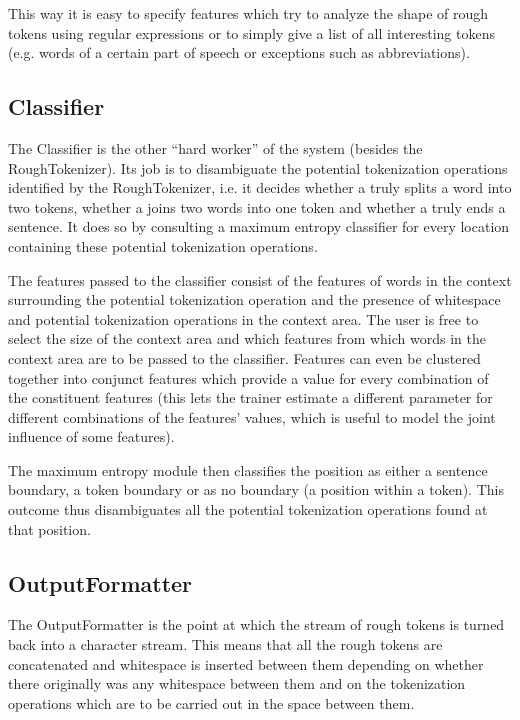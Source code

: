This way it is easy to specify features which try to analyze the shape
of rough tokens using regular expressions or to simply give a list of
all interesting tokens (e.g. words of a certain part of speech or
exceptions such as abbreviations).

\subsection{Classifier}

The Classifier is the other ``hard worker'' of the system (besides the
RoughTokenizer). Its job is to disambiguate the potential tokenization
operations identified by the RoughTokenizer, i.e. it decides whether a
\maysplit{} truly splits a word into two tokens, whether a \mayjoin{}
joins two words into one token and whether a \maybreaksentence{} truly
ends a sentence. It does so by consulting a maximum entropy classifier
for every location containing these potential tokenization operations.

The features passed to the classifier consist of the features of words
in the context surrounding the potential tokenization operation and
the presence of whitespace and potential tokenization operations in
the context area. The user is free to select the size of the context
area and which features from which words in the context area are to be
passed to the classifier. Features can even be clustered together into
conjunct features which provide a value for every combination of the
constituent features (this lets the trainer estimate a different
parameter for different combinations of the features' values, which is
useful to model the joint influence of some features).

The maximum entropy module then classifies the position as either a
sentence boundary, a token boundary or as no boundary (a position
within a token). This outcome thus disambiguates all the potential
tokenization operations found at that position.

\subsection{OutputFormatter}

The OutputFormatter is the point at which the stream of rough tokens
is turned back into a character stream. This means that all the rough
tokens are concatenated and whitespace is inserted between them
depending on whether there originally was any whitespace between them
and on the tokenization operations which are to be carried out in the
space between them.

